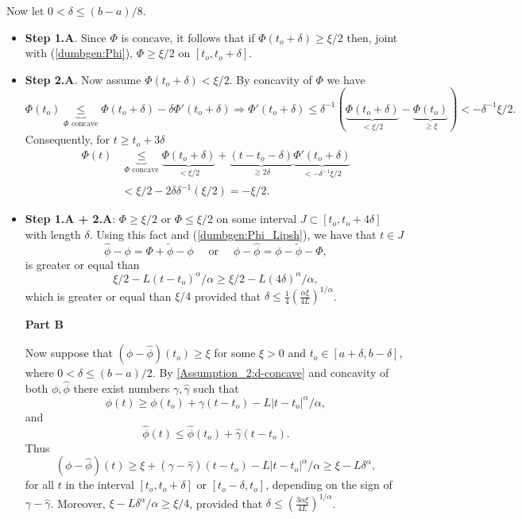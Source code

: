 \documentclass{article} %
\def\eqref#1{equation~\ref{#1}}
\renewcommand{\eqref}[1]{(\ref{#1})}
\begin{document}
Now let $0<\delta \leq(b-a) / 8$.
\begin{itemize}
\item \textbf{Step 1.A}. Since $\Phi$ is concave, it follows that if $\Phi\left(t_o+\delta\right) \geq \xi / 2$ then, joint with \eqref{dumbgen:Phi}, $\Phi \geq \xi / 2$ on $\left[t_o, t_o+\delta\right]$.
    \item \textbf{Step 2.A}. Now assume $\Phi\left(t_o+\delta\right)<\xi / 2$. By concavity of $\Phi$ we have 
$$
\Phi(t_o) \underset{\Phi\text{ concave}}{\underbrace{\leq}} \Phi(t_o+\delta) - \delta \Phi '(t_o+\delta) \Rightarrow \Phi '(t_o+\delta) \leq  \delta^{-1}(\underset{< \xi/2}{\underbrace{\Phi(t_o+\delta)}} - \underset{\geq \xi}{\underbrace{\Phi(t_o)}}) < -\delta^{-1}\xi/2.
$$
Consequently, for $t \geq t_o+3 \delta$
\begin{align*}
\Phi(t) &\underset{\Phi\text{ concave}}{\underbrace{\leq}} \underset{< \xi/2}{\underbrace{\Phi(t_o+\delta)}} + \underset{\geq 2\delta}{\underbrace{(t-t_o-\delta)}} \underset{< -\delta^{-1} \xi / 2}{\underbrace{\Phi '(t_o+\delta)}}\\
& < \xi / 2-2\delta\delta^{-1}(\xi / 2) =-\xi / 2.
\end{align*}

\item \textbf{Step 1.A + 2.A}: $\Phi \geq \xi / 2$ or $\Phi \leq \xi / 2$ on some interval $J \subset\left[t_o, t_o+4 \delta\right]$ with length $\delta$. Using this fact and \eqref{dumbgen:Phi_Lipsh}, we have that $t \in J$
$$
\widehat{\phi} - \phi = \Phi + \widetilde{\phi} - \phi \quad \text{ or } \quad \phi - \widehat{\phi} = \phi- \widetilde{\phi} -\Phi,  
$$
is greater or equal than
$$
\xi/2 - L (t-t_o)^{\alpha}/\alpha \geq \xi/2 -L (4\delta)^{\alpha}/\alpha ,
$$
which is greater or equal than $\xi/4$ provided that $\delta \leq \frac{1}{4}\left( \frac{\alpha \xi}{4L}\right)^{1/\alpha}$.


\textbf{Part B}

Now suppose that $(\phi-\widehat{\phi})\left(t_o\right) \geq \xi$ for some $\xi>0$ and $t_o \in[a+\delta, b-\delta]$, where $0<\delta \leq(b-a) / 2$. By \cref{Assumption_2:d-concave} and concavity of both $\phi,\widehat{\phi}$ there exist numbers $\gamma, \widehat{\gamma}$ such that
$$
\phi(t) \geq \phi\left(t_o\right)+\gamma\left(t-t_o\right)-L\left|t-t_o\right|^{\alpha}/\alpha,
$$
and
$$
\widehat{\phi}(t) \leq \widehat{\phi}\left(t_o\right)+\widehat{\gamma}\left(t-t_o\right).
$$
Thus
$$
(\phi-\widehat{\phi})(t) \geq \xi+(\gamma-\widehat{\gamma})\left(t-t_o\right)-L\left|t-t_o\right|^{\alpha}/\alpha \geq \xi-L \delta^{\alpha},
$$
for all $t$ in the interval $\left[t_o, t_o+\delta\right]$ or $\left[t_o-\delta, t_o\right]$, depending on the sign of $\gamma-\widehat{\gamma}$. Moreover, $\xi-L \delta^\alpha / \alpha \geq \xi / 4$, provided that $\delta \leq \left( \frac{3\alpha \xi}{4L}\right)^{1/\alpha}$.
\end{itemize}
\end{document}
